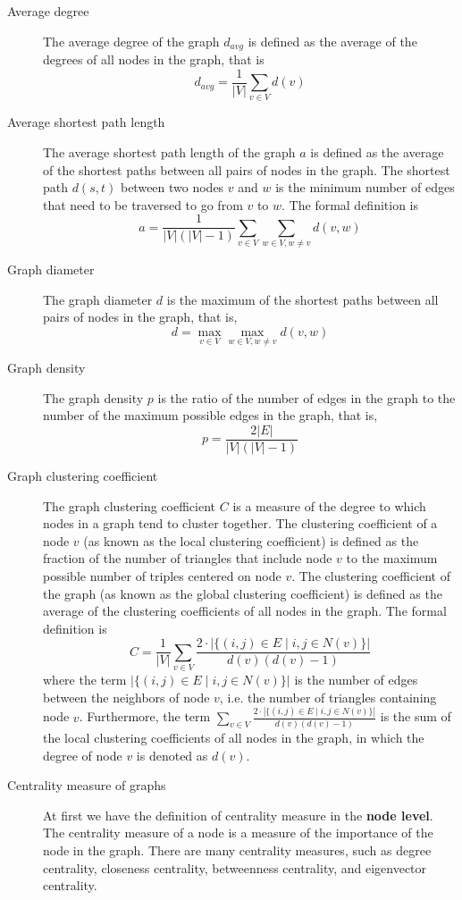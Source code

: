 \documentclass{article}
\begin{document}
\begin{description}
    \item [Average degree] The average degree of the graph $d_{avg}$ is defined as the average of the degrees of all nodes in the graph, that is
    $$ d_{avg} = \frac{1}{|V|} \sum_{v \in V} d(v)$$
    \item [Average shortest path length] The average shortest path length of the graph $a$ is defined as the average of the shortest paths between all pairs of nodes in the graph. The shortest path $d(s, t)$ between two nodes $v$ and $w$ is the minimum number of edges that need to be traversed to go from $v$ to $w$. The formal definition is
    $$
a = \frac{1}{|V|(|V|-1)} \sum_{v \in V} \sum_{w \in V, w \neq v} d(v, w)
    $$

    \item [Graph diameter] The graph diameter $d$ is the maximum of the shortest paths between all pairs of nodes in the graph, that is,
    $$
d = \max_{v \in V} \max_{w \in V, w \neq v} d(v, w)
    $$

    \item [Graph density] The graph density $p$ is the ratio of the number of edges in the graph to the number of the maximum possible edges in the graph, that is,
    $$
p = \frac{2|E|}{|V|(|V|-1)}
    $$
    
    \item [Graph clustering coefficient] The graph clustering coefficient $C$ is a measure of the degree to which nodes in a graph tend to cluster together. The clustering coefficient of a node $v$ (as known as the local clustering coefficient) is defined as the fraction of the number of triangles that include node $v$ to the maximum possible number of triples centered on node $v$. The clustering coefficient of the graph (as known as the global clustering coefficient) is defined as the average of the clustering coefficients of all nodes in the graph. The formal definition is
    $$
C = \frac{1}{|V|} \sum_{v \in V} \frac{2\cdot |\{(i,j)\in E \mid i, j \in N(v)\}|}{d(v)(d(v)-1)}
    $$
    where the term $|\{(i,j)\in E \mid i, j \in N(v)\}|$ is the number of edges between the neighbors of node $v$, i.e. the number of triangles containing node $v$. Furthermore, the term $\sum_{v \in V} \frac{2\cdot |\{(i,j)\in E \mid i, j \in N(v)\}|}{d(v)(d(v)-1)}$ is the sum of the local clustering coefficients of all nodes in the graph, in which the degree of node $v$ is denoted as $d(v)$.

    \item [Centrality measure of graphs] At first we have the definition of centrality measure in the \textbf{node level}. The centrality measure of a node is a measure of the importance of the node in the graph. There are many centrality measures, such as degree centrality, closeness centrality, betweenness centrality, and eigenvector centrality. 
    

\end{description}
\end{document}
